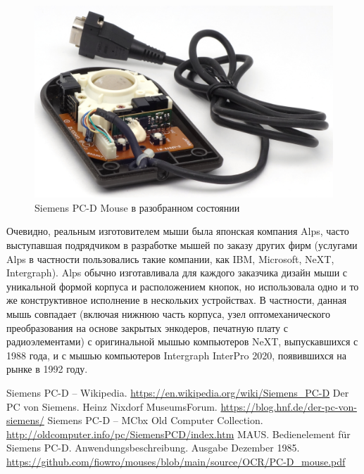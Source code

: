 \documentclass[11pt, a4paper]{article}
\begin{document}
\begin{figure}[h]
    \centering
    \includegraphics[scale=0.8]{1985_siemens_pcd_mouse/inside_30.jpg} 
    \caption{Siemens PC-D Mouse в разобранном состоянии}
    \label{fig:SiemensPCDInside}
\end{figure}

Очевидно, реальным изготовителем мыши была японская компания Alps, часто выступавшая подрядчиком в разработке мышей по заказу других фирм (услугами Alps в частности пользовались такие компании, как IBM, Microsoft, NeXT, Intergraph). Alps обычно изготавливала для каждого заказчика дизайн мыши с уникальной формой корпуса и расположением кнопок, но использовала одно и то же конструктивное исполнение в нескольких устройствах. В частности, данная мышь совпадает (включая нижнюю часть корпуса, узел оптомеханического преобразования на основе закрытых энкодеров, печатную плату с радиоэлементами) с оригинальной мышью компьютеров NeXT, выпускавшихся с 1988 года, и с мышью компьютеров Intergraph InterPro 2020, появившихся на рынке в 1992 году.

\begin{thebibliography}{9}
 Siemens PC-D -- Wikipedia. \url{https://en.wikipedia.org/wiki/Siemens_PC-D}
 Der PC von Siemens. Heinz Nixdorf MuseumsForum. \url{https://blog.hnf.de/der-pc-von-siemens/}
 Siemens PC-D -- MCbx Old Computer Collection. \url{http://oldcomputer.info/pc/SiemensPCD/index.htm}
 MAUS. Bedienelement für Siemens PC-D. Anwendungsbeschreibung. Ausgabe Dezember 1985. \url{https://github.com/fiowro/mouses/blob/main/source/OCR/PC-D_mouse.pdf}
\end{thebibliography}
\end{document}
